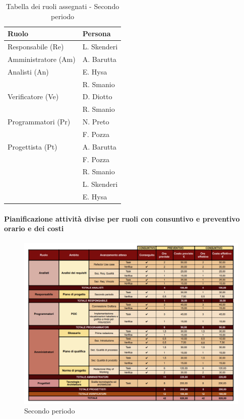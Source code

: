 \vspace{0.4cm}

\begin{table}[H]
    \centering
    \begin{tabular}{|L{4cm}|L{2cm}|}
    \hline
    \textbf{Ruolo} & \textbf{Persona} \\
    \hline
    \hline
    Responsabile (Re)   & L. Skenderi \\
    \hline
    Amministratore (Am) & A. Barutta \\
    \hline
    Analisti (An)       & E. Hysa \\
                        & R. Smanio \\
    \hline
    Verificatore (Ve)   & D. Diotto \\
                        & R. Smanio \\
    \hline
    Programmatori (Pr)  & N. Preto \\
                        & F. Pozza \\
    \hline
    Progettista (Pt)    & A. Barutta \\
                        & F. Pozza \\
                        & R. Smanio \\
                        & L. Skenderi \\
                        & E. Hysa \\
    \hline
    \end{tabular}
    \caption{Tabella dei ruoli assegnati - Secondo periodo}
    \label{tab:Ruoli_persone_2}
    \end{table}
    
\newpage
\paragraph{Pianificazione attività divise per ruoli con consuntivo e preventivo orario e dei costi}

\begin{figure}[H]
    \centering
    \includegraphics[width=\linewidth, height=0.9\textheight, keepaspectratio]{../Images/tabG2.PNG}
    \caption{Secondo periodo}
    \label{fig:Secondo_periodo}
\end{figure}


